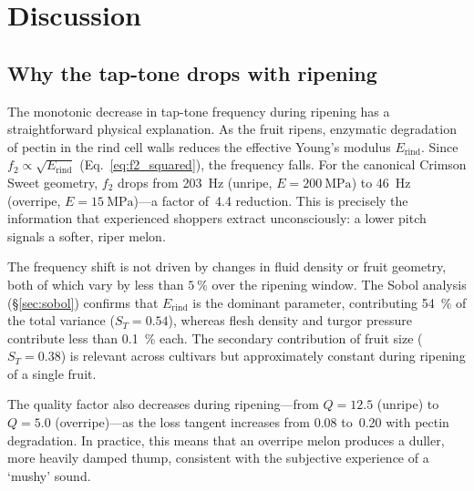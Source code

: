 \section{Discussion}
\label{sec:discussion}

\subsection{Why the tap-tone drops with ripening}
\label{sec:physical_interp}

The monotonic decrease in tap-tone frequency during ripening
has a straightforward physical
explanation.  As the fruit ripens, enzymatic degradation of pectin in the
rind cell walls reduces the effective Young's modulus
$E_{\mathrm{rind}}$.  Since $f_2 \propto \sqrt{E_{\mathrm{rind}}}$
(Eq.~\ref{eq:f2_squared}), the frequency falls.  For the canonical
Crimson Sweet geometry, $f_2$ drops from \SI{203}{\hertz} (unripe,
$E = \SI{200}{\mega\pascal}$) to \SI{46}{\hertz} (overripe,
$E = \SI{15}{\mega\pascal}$)---a factor of~4.4 reduction.  This is
precisely the information that experienced shoppers extract
unconsciously: a lower pitch signals a softer, riper melon.

The frequency shift is not driven by changes in fluid density or fruit
geometry, both of which vary by less than $\SI{5}{\percent}$ over the
ripening window.  The Sobol analysis (\S\ref{sec:sobol}) confirms that
$E_{\mathrm{rind}}$ is the dominant parameter, contributing
\SI{54}{\percent} of the total variance ($S_T = 0.54$), whereas flesh
density and turgor pressure contribute less than \SI{0.1}{\percent}
each.  The secondary contribution of fruit size ($S_T = 0.38$) is
relevant across cultivars but approximately constant during ripening of
a single fruit.

The quality factor also decreases during ripening---from $Q = 12.5$
(unripe) to $Q = 5.0$ (overripe)---as the loss tangent increases from
0.08 to~0.20 with pectin degradation.  In practice, this means that an
overripe melon produces a duller, more heavily damped thump, consistent
with the subjective experience of a `mushy' sound.

